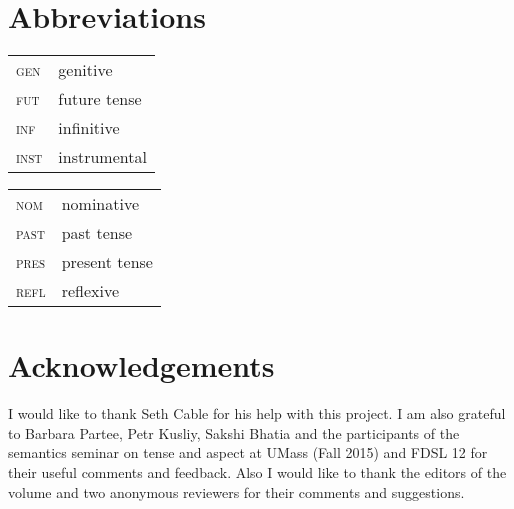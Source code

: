 \documentclass[output=paper,modfonts,newtxmath,hidelinks]{langscibook}
\begin{document}


\section*{Abbreviations}

\begin{tabularx}{.5\textwidth}{@{}lQ@{}}
\textsc{gen}&{genitive}\\
\textsc{fut}&{future} tense\\
\textsc{inf}&{infinitive}\\
\textsc{inst}&{instrumental}\\
\end{tabularx}%
\begin{tabularx}{.5\textwidth}{@{}lQ@{}}
\textsc{nom}&{nominative}\\
\textsc{past}&{{past} tense}\\
\textsc{pres}&{{present} tense}\\
\textsc{refl}&reflexive\\
\end{tabularx}

\section*{Acknowledgements}

I would like to thank Seth Cable for his help with this project. I am also grateful to Barbara Partee, Petr Kusliy, Sakshi Bhatia and the participants of the  {semantics} seminar on tense and aspect at UMass (Fall 2015) and FDSL 12 for their useful comments and feedback. Also I would like to thank the editors of the volume and two anonymous reviewers for their comments and suggestions.

\sloppy
\printbibliography[heading=subbibliography,notkeyword=this]

\clearpage 
\end{document}
